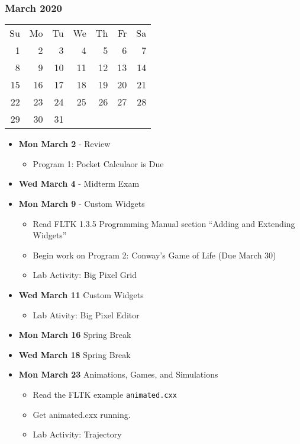 \subsubsection*{March 2020}
\begin{tabular}{rrrrrrr}
Su & Mo & Tu & We & Th & Fr & Sa\\ \cline{4-4}
 1 &  2 &  3 & \multicolumn{1}{|r|}{4} &  5 &  6 &  7\\ \cline{4-4}
 8 &  9 & 10 & 11 & 12 & 13 & 14\\ 
15 & 16 & 17 & 18 & 19 & 20 & 21\\ 
22 & 23 & 24 & 25 & 26 & 27 & 28\\
29 & 30 & 31 &    &    &    & \\
\end{tabular}
\begin{itemize}
\item\textbf{Mon March  2} - Review
    \begin{itemize}
        \item Program 1: Pocket Calculaor is Due
    \end{itemize}
\item\textbf{Wed March  4} - Midterm Exam
\item\textbf{Mon March  9} - Custom Widgets
    \begin{itemize}
        \item Read FLTK 1.3.5 Programming Manual section ``Adding and Extending Widgets''
        \item Begin work on Program 2: Conway's Game of Life (Due March 30)
        \item Lab Activity: Big Pixel Grid
    \end{itemize}
\item\textbf{Wed March 11} Custom Widgets
    \begin{itemize}
        \item Lab Ativity: Big Pixel Editor
    \end{itemize}
\item\textbf{Mon March 16} Spring Break
\item\textbf{Wed March 18} Spring Break
\item\textbf{Mon March 23} Animations, Games, and Simulations
    \begin{itemize}
        \item Read the FLTK example \texttt{animated.cxx} 
        \item Get animated.cxx running.
        \item Lab Activity: Trajectory

\end{itemize}
\end{itemize}
